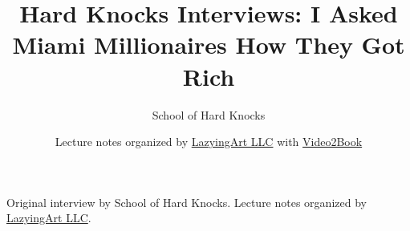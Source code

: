 \documentclass[11pt,oneside]{book}
\begin{document}
\frontmatter
\title{Hard Knocks Interviews: I Asked Miami Millionaires How They Got Rich}
\author{School of Hard Knocks}
\date{Lecture notes organized by \href{https://lazying.art}{LazyingArt LLC} with \href{https://github.com/lachlanchen/Video2Book}{Video2Book}}
\maketitle
\begin{center}
\small Original interview by School of Hard Knocks. Lecture notes organized by \href{https://lazying.art}{LazyingArt LLC}.
\end{center}
\clearpage
\mainmatter

\end{document}
